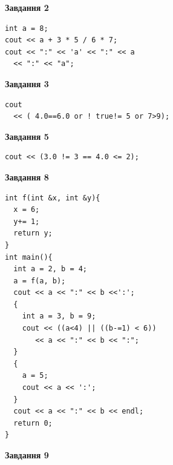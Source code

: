 \documentclass[12pt, ukrainian]{article}
\begin{document}
{\begin {large}
\begin{minipage}[t]{7.0cm}
\end{minipage}
\vline \hspace{1mm}
\begin{minipage}[t]{11.0cm}

\begin{center}
\textbf{Завдання 2}
\end{center}
\vspace{-8mm}

\begin{verbatim}
int a = 8;
cout << a + 3 * 5 / 6 * 7;
cout << ":" << 'a' << ":" << a 
  << ":" << "a";
\end{verbatim}



\begin{center}
\textbf{Завдання 3}
\end{center}
\vspace{-8mm}

\begin{verbatim}
cout 
  << ( 4.0==6.0 or ! true!= 5 or 7>9);
\end{verbatim}



\begin{center}
\textbf{Завдання 5}
\end{center}
\vspace{-8mm}

\begin{verbatim}
cout << (3.0 != 3 == 4.0 <= 2);
\end{verbatim}



\begin{center}
\textbf{Завдання 8}
\end{center}
\vspace{-8mm}

\begin{verbatim}
int f(int &x, int &y){
  x = 6;
  y+= 1;
  return y;
}
int main(){
  int a = 2, b = 4;
  a = f(a, b);
  cout << a << ":" << b <<':';
  {
    int a = 3, b = 9;
    cout << ((a<4) || ((b-=1) < 6))
       << a << ":" << b << ":";
  }
  {
    a = 5;
    cout << a << ':';
  }
  cout << a << ":" << b << endl;
  return 0;
}
\end{verbatim}

\end{minipage}


\begin{minipage}[t]{7.0cm}

\begin{center}
\textbf{Завдання 9}
\end{center}
\vspace{-8mm}


\end{minipage}
\end{large}}
\end{document}
